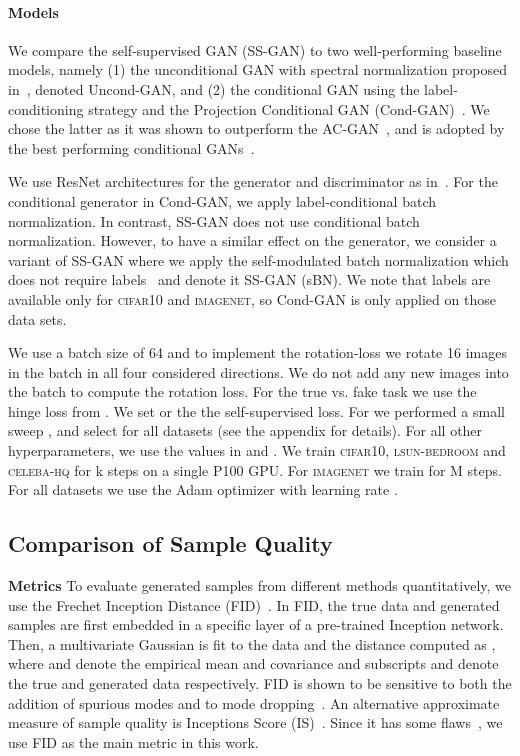 \documentclass[10pt,twocolumn,letterpaper]{article}
\newcommand{\celebahq}{\textsc{celeba-hq}}
\newcommand{\lsun}{\textsc{lsun-bedroom}}
\newcommand{\cifar}{\textsc{cifar10}}
\newcommand{\imagenet}{\textsc{imagenet}}
\begin{document}
\paragraph{Models\label{sec:exp_models}}
We compare the self-supervised GAN (SS-GAN) to two well-performing baseline models, namely (1) the unconditional GAN with spectral normalization proposed in~\citet{miyato2018spectral}, denoted Uncond-GAN,
and (2) the conditional GAN using the label-conditioning strategy and the Projection Conditional GAN (Cond-GAN)~\citep{miyato2018cgans}.
We chose the latter as it was shown to outperform the AC-GAN~\citep{odena2017}, and is adopted by the best performing conditional GANs~\citep{zhang2018self,mescheder2018training,brock2018large}.

We use ResNet architectures for the generator and discriminator as in~\citet{miyato2018spectral}.
For the conditional generator in Cond-GAN,
we apply label-conditional batch normalization.
In contrast, SS-GAN does not use conditional batch normalization.
However, to have a similar effect on the generator, we consider a variant of SS-GAN where we apply the self-modulated batch normalization which does not require labels~\citep{abn} and denote it SS-GAN (sBN).
We note that labels are available only for \cifar{} and \imagenet{}, so Cond-GAN is only applied on those data sets.

We use a batch size of 64 and to implement the rotation-loss we rotate 16 images in the batch in all four considered directions.
We do not add any new images into the batch to compute the rotation loss.
For the true vs. fake task we use the hinge loss from \citet{miyato2018spectral}.
We set  or the the self-supervised loss.
For  we performed a small sweep , and select  for all datasets (see the appendix for details).
For all other hyperparameters, we use the values in \citet{miyato2018spectral} and \citet{miyato2018cgans}.
We train \cifar{}, \lsun{} and \celebahq{} for k steps on a single P100 GPU.
For \imagenet{} we train for M steps.
For all datasets we use the Adam optimizer with learning rate .

\subsection{Comparison of Sample Quality \label{sec:fid_quantitative_compare}}
\noindent\textbf{Metrics}\quad
To evaluate generated samples from different methods quantitatively, we use the Frechet Inception Distance (FID)~\citep{heusel2017gans}.
In FID, the true data and generated samples are first embedded in a specific layer of a pre-trained Inception network.
Then, a multivariate Gaussian is fit to the data and the distance computed as
,
where
 and  denote the empirical mean and covariance and subscripts  and  denote the true and generated data respectively. FID is shown to be sensitive to both the addition of spurious modes and to mode dropping~\citep{sajjadi2018assessing,lucic2018}.
An alternative approximate measure of sample quality is Inceptions Score (IS)~\citet{salimans2016improved}.
Since it has some flaws~\citet{barratt2018note}, we use FID as the main metric in this work.
\end{document}

